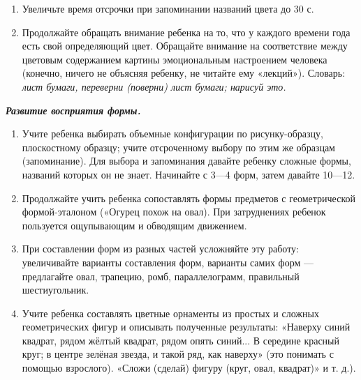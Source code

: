 \documentclass[a5paper]{book}
\renewcommand{\emph}[1]{\textit{#1}}
\begin{document}
\begin{enumerate}
\def\labelenumi{\arabic{enumi}.}
\setcounter{enumi}{2}
\item
  
  Увеличьте время отсрочки при запоминании названий цвета до 30 с.
  
\item
  
  Продолжайте обращать внимание ребенка на то, что у каждого времени
  года есть свой определяющий цвет. Обращайте внимание на соответствие
  между цветовым содержанием картины эмоциональным настроением человека
  (конечно, ничего не объясняя ребенку, не читайте ему «лекций»).
  Словарь: \emph{лист бумаги, переверни (поверни) лист бумаги; нарисуй
  это.}
  
\end{enumerate}


\emph{\textbf{Развитие восприятия формы.}}


\begin{enumerate}
\def\labelenumi{\arabic{enumi}.}
\item
  
  Учите ребенка выбирать объемные конфигурации по рисунку-образцу,
  плоскостному образцу; учите отсроченному выбору по этим же образцам
  (запоминание). Для выбора и запоминания давайте ребенку сложные формы,
  названий которых он не знает. Начинайте с 3---4 форм, затем давайте
  10---12.
  
\item
  
  Продолжайте учить ребенка сопоставлять формы предметов с
  геометрической формой-эталоном («Огурец похож на овал). При
  затруднениях ребенок пользуется ощупывающим и обводящим движением.
  
\item
  
  При составлении форм из разных частей усложняйте эту работу:
  увеличивайте варианты составления форм, варианты самих форм ---
  предлагайте овал, трапецию, ромб, параллелограмм, правильный
  шестиугольник.
  
\item
  
  Учите ребенка составлять цветные орнаменты из простых и сложных
  геометрических фигур и описывать полученные результаты: «Наверху синий
  квадрат, рядом жёлтый квадрат, рядом опять синий... В середине красный
  круг; в центре зелёная звезда, и такой ряд, как наверху» (это понимать
  с помощью взрослого). «Сложи (сделай) фигуру (круг, овал, квадрат)» и
  т. д.).
  
\end{enumerate}
\end{document}
